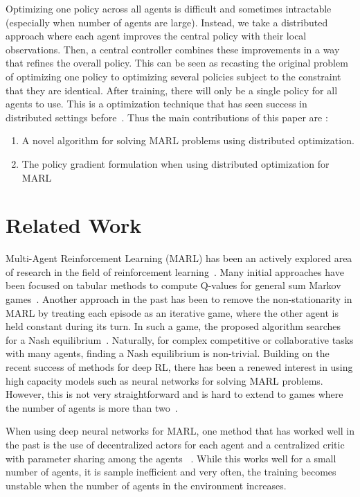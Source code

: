 \documentclass{article}
\begin{document}
Optimizing one policy across all agents is difficult and sometimes intractable (especially when number of agents are large). Instead, we take a distributed approach where each agent improves the central policy with their local observations. Then, a central controller combines these improvements in a way that refines the overall policy. This can be seen as recasting the original problem of optimizing one policy to optimizing several policies subject to the constraint that they are identical. After training, there will only be a single policy for all agents to use. This is a optimization technique that has seen success in distributed settings before~\cite{boyd2011distributed}.
Thus the main contributions of this paper are :
\begin{enumerate}
\item A novel algorithm for solving MARL problems using distributed optimization.
\item The policy gradient formulation when using distributed optimization for MARL
\end{enumerate}
\section{Related Work}
Multi-Agent Reinforcement Learning (MARL) has been an actively explored area of research in the field of reinforcement learning~\cite{busoniu2006multi,littman1994markov}. Many initial approaches have been focused on tabular methods to compute Q-values for general sum Markov games~\cite{hu2003nash}. Another approach in the past has been to remove the non-stationarity in MARL by treating each episode as an iterative game, where the other agent is held constant during its turn. In such a game, the proposed algorithm searches for a Nash equilibrium~\cite{conitzer2007awesome}. Naturally, for complex competitive or collaborative tasks with many agents, finding a Nash equilibrium is non-trivial. Building on the recent success of methods for deep RL, there has been a renewed interest in using high capacity models such as neural networks for solving MARL problems. However, this is not very straightforward and is hard to extend to games where the number of agents is more than two~\cite{tampuu2017multiagent}. 

When using deep neural networks for MARL, one method that has worked well in the past is the use of decentralized actors for each agent and a centralized critic with parameter sharing among the agents ~\cite{foerster2017counterfactual,lowe2017multi}. While this works well for a small number of agents, it is sample inefficient and very often, the training becomes unstable when the number of agents in the environment increases. 
\end{document}

